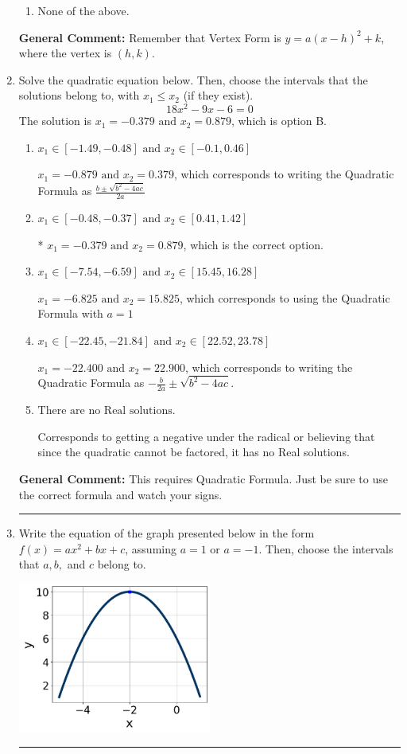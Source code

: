 \documentclass{extbook}[14pt]
\newcommand{\litem}[1]{\item #1

\rule{\textwidth}{0.4pt}}
\begin{document}
\begin{enumerate}
{\begin{enumerate}[label=\Alph*.]
\begin{multicols}{2}
\end{multicols}\item None of the above.\end{enumerate}
\textbf{General Comment:} Remember that Vertex Form is $y = a(x-h)^2+k$, where the vertex is $(h, k)$.
}
\litem{
Solve the quadratic equation below. Then, choose the intervals that the solutions belong to, with $x_1 \leq x_2$ (if they exist).
\[ 18x^{2} -9 x -6 = 0 \]The solution is \( x_1 = -0.379 \text{ and } x_2 = 0.879 \), which is option B.\begin{enumerate}[label=\Alph*.]
\item \( x_1 \in [-1.49, -0.48] \text{ and } x_2 \in [-0.1, 0.46] \)

 $x_1 = -0.879 \text{ and } x_2 = 0.379$, which corresponds to writing the Quadratic Formula as $\frac{b \pm \sqrt{b^2 - 4ac}}{2a}$
\item \( x_1 \in [-0.48, -0.37] \text{ and } x_2 \in [0.41, 1.42] \)

* $x_1 = -0.379 \text{ and } x_2 = 0.879$, which is the correct option.
\item \( x_1 \in [-7.54, -6.59] \text{ and } x_2 \in [15.45, 16.28] \)

 $x_1 = -6.825 \text{ and } x_2 = 15.825$, which corresponds to using the Quadratic Formula with $a=1$
\item \( x_1 \in [-22.45, -21.84] \text{ and } x_2 \in [22.52, 23.78] \)

 $x_1 = -22.400 \text{ and } x_2 = 22.900$, which corresponds to writing the Quadratic Formula as $-\frac{b}{2a} \pm \sqrt{b^2 - 4ac}$.
\item \( \text{There are no Real solutions.} \)

Corresponds to getting a negative under the radical or believing that since the quadratic cannot be factored, it has no Real solutions.
\end{enumerate}

\textbf{General Comment:} This requires Quadratic Formula. Just be sure to use the correct formula and watch your signs.
}
\litem{
Write the equation of the graph presented below in the form $f(x)=ax^2+bx+c$, assuming  $a=1$ or $a=-1$. Then, choose the intervals that $a, b,$ and $c$ belong to.

\begin{center}
    \includegraphics[width=0.5\textwidth]{../Figures/quadraticGraphToEquationC.png}
\end{center}


}
\end{enumerate}
\end{document}

